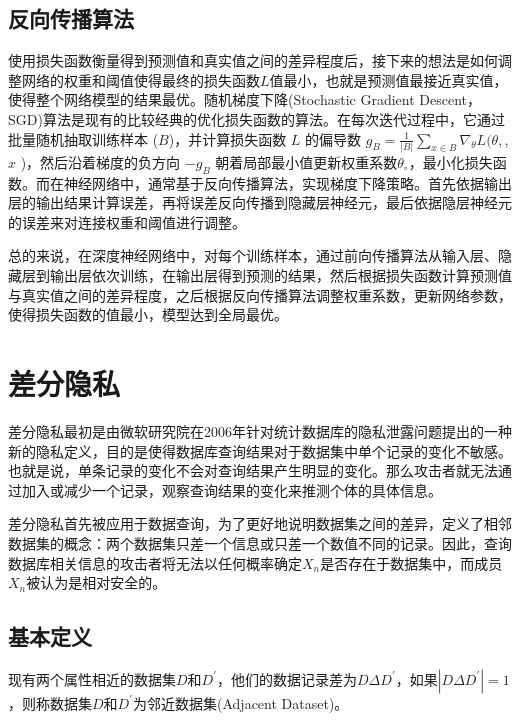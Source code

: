 \subsection{反向传播算法}
使用损失函数衡量得到预测值和真实值之间的差异程度后，接下来的想法是如何调整网络的权重和阈值使得最终的损失函数$L$值最小，也就是预测值最接近真实值，使得整个网络模型的结果最优。随机梯度下降(Stochastic Gradient Descent， SGD)算法是现有的比较经典的优化损失函数的算法。在每次迭代过程中，它通过批量随机抽取训练样本 ($B$)，并计算损失函数 $L$ 的偏导数 $g_{B}=\frac{1}{|B|} \sum_{x \in B} \nabla_{\theta} L(\theta,$,$x$ )，然后沿着梯度的负方向 $-g_{B}$ 朝着局部最小值更新权重系数$\theta_{\circ}$，最小化损失函数。而在神经网络中，通常基于反向传播算法，实现梯度下降策略。首先依据输出层的输出结果计算误差，再将误差反向传播到隐藏层神经元，最后依据隐层神经元的误差来对连接权重和阈值进行调整。

总的来说，在深度神经网络中，对每个训练样本，通过前向传播算法从输入层、隐藏层到输出层依次训练，在输出层得到预测的结果，然后根据损失函数计算预测值与真实值之间的差异程度，之后根据反向传播算法调整权重系数，更新网络参数，使得损失函数的值最小，模型达到全局最优。

\section{差分隐私}
差分隐私最初是由微软研究院在2006年针对统计数据库的隐私泄露问题提出的一种新的隐私定义，目的是使得数据库查询结果对于数据集中单个记录的变化不敏感。也就是说，单条记录的变化不会对查询结果产生明显的变化。那么攻击者就无法通过加入或减少一个记录，观察查询结果的变化来推测个体的具体信息。

差分隐私首先被应用于数据查询，为了更好地说明数据集之间的差异，定义了相邻数据集的概念：两个数据集只差一个信息或只差一个数值不同的记录。因此，查询数据库相关信息的攻击者将无法以任何概率确定$X_{n}$是否存在于数据集中，而成员$X_{n}$被认为是相对安全的。

\subsection{基本定义}
\begin{define}[邻近数据集]\label{邻近数据集}
现有两个属性相近的数据集$D$和$D^{\prime}$，他们的数据记录差为$D \Delta D^{\prime}$，如果$\left|D \Delta D^{\prime}\right|=1$，则称数据集$D$和$D^{\prime}$为邻近数据集(Adjacent Dataset)。
\end{define}

